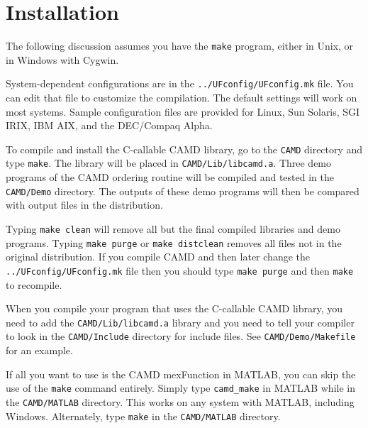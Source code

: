 \documentclass[11pt]{article}
\begin{document}
\section{Installation}
\label{Install}

The following discussion assumes you have the {\tt make} program, either in
Unix, or in Windows with Cygwin.

System-dependent configurations are in the {\tt ../UFconfig/UFconfig.mk}
file.  You can edit that file to customize the compilation.  The default
settings will work on most systems.
Sample configuration files are provided
for Linux, Sun Solaris, SGI IRIX, IBM AIX, and the DEC/Compaq Alpha.

To compile and install the C-callable CAMD library,
go to the {\tt CAMD} directory and type {\tt make}.
The library will be placed in {\tt CAMD/Lib/libcamd.a}.
Three demo programs of the CAMD ordering routine will be compiled and tested in
the {\tt CAMD/Demo} directory.
The outputs of these demo programs will then be compared with output
files in the distribution.

Typing {\tt make clean} will remove all but the final compiled libraries
and demo programs.  Typing {\tt make purge} or {\tt make distclean}
removes all files not in the original distribution.
If you compile CAMD and then later change the {\tt ../UFconfig/UFconfig.mk} file
then you should type {\tt make purge} and then {\tt make} to recompile.

When you compile your program that uses the C-callable CAMD library,
you need to add the {\tt CAMD/Lib/libcamd.a} library
and you need to tell your compiler to look in the
{\tt CAMD/Include} directory for include
files.
See {\tt CAMD/Demo/Makefile} for an example.

If all you want to use is the CAMD mexFunction in MATLAB, you can skip
the use of the {\tt make} command entirely.  Simply type
{\tt camd\_make} in MATLAB while in the {\tt CAMD/MATLAB} directory.
This works on any system with MATLAB, including Windows.
Alternately, type {\tt make} in the {\tt CAMD/MATLAB} directory.
\end{document}
